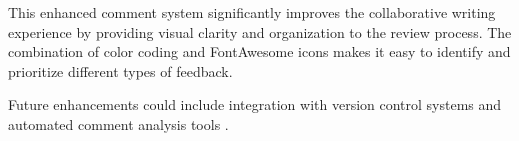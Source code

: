 \documentclass[manuscript]{acmart}
\begin{document}
This enhanced comment system significantly improves the collaborative writing experience by providing visual clarity and organization to the review process. The combination of color coding and FontAwesome icons makes it easy to identify and prioritize different types of feedback.


Future enhancements could include integration with version control systems and automated comment analysis tools \cite{Lamport:LaTeX}.


\bigskip
\noindent\commentcount



\end{document}
